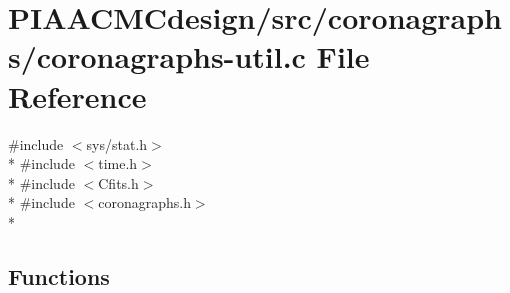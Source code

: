 \hypertarget{PIAACMCdesign_2src_2coronagraphs_2coronagraphs-util_8c}{\section{P\+I\+A\+A\+C\+M\+Cdesign/src/coronagraphs/coronagraphs-\/util.c File Reference}
\label{PIAACMCdesign_2src_2coronagraphs_2coronagraphs-util_8c}
}
{\ttfamily \#include $<$sys/stat.\+h$>$}\\*
{\ttfamily \#include $<$time.\+h$>$}\\*
{\ttfamily \#include $<$Cfits.\+h$>$}\\*
{\ttfamily \#include $<$coronagraphs.\+h$>$}\\*
\subsection*{Functions}
